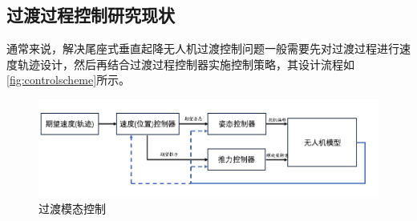 \subsection{过渡过程控制研究现状}
通常来说，解决尾座式垂直起降无人机过渡控制问题一般需要先对过渡过程进行速度轨迹设计，然后再结合过渡过程控制器实施控制策略，其设计流程如\autoref{fig:controlscheme}所示。
\begin{figure}[H]
    \centering
    \includegraphics[width=1.0\textwidth]{figure/chapter1/控制流程.png}
    \caption{\label{fig:controlscheme}过渡模态控制}
\end{figure}

